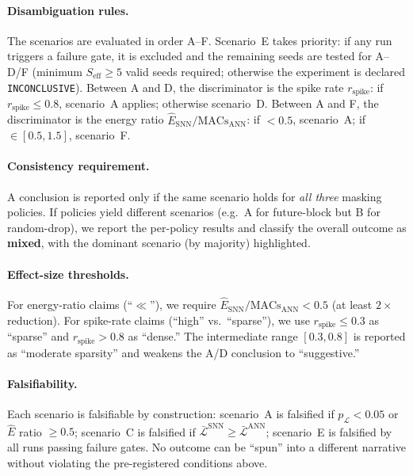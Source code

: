 \documentclass[11pt,a4paper]{article}
\begin{document}
\paragraph{Disambiguation rules.}
The scenarios are evaluated in order A--F.
Scenario~E takes priority: if any run triggers a failure gate,
it is excluded and the remaining seeds are tested for
A--D/F (minimum $S_{\text{eff}} \geq 5$ valid seeds required;
otherwise the experiment is declared \texttt{INCONCLUSIVE}).
Between A and D, the discriminator is the spike rate
$r_{\text{spike}}$: if $r_{\text{spike}} \leq 0.8$, scenario~A
applies; otherwise scenario~D.
Between A and F, the discriminator is the energy ratio
$\hat{E}_{\text{SNN}} / \text{MACs}_{\text{ANN}}$: if
$< 0.5$, scenario~A; if $\in [0.5, 1.5]$, scenario~F.

\paragraph{Consistency requirement.}
A conclusion is reported only if the same scenario holds for
\emph{all three} masking policies.  If policies yield different
scenarios (e.g.\ A for future-block but B for random-drop), we
report the per-policy results and classify the overall outcome as
\textbf{mixed}, with the dominant scenario (by majority)
highlighted.

\paragraph{Effect-size thresholds.}
For energy-ratio claims (``$\ll$''), we require
$\hat{E}_{\text{SNN}} / \text{MACs}_{\text{ANN}} < 0.5$
(at least $2\times$ reduction).  For spike-rate claims
(``high'' vs.\ ``sparse''), we use
$r_{\text{spike}} \leq 0.3$ as ``sparse'' and
$r_{\text{spike}} > 0.8$ as ``dense.''
The intermediate range $[0.3, 0.8]$ is reported as
``moderate sparsity'' and weakens the A/D conclusion
to ``suggestive.''

\paragraph{Falsifiability.}
Each scenario is falsifiable by construction:
scenario~A is falsified if $p_{\mathcal{L}} < 0.05$ or
$\hat{E}$ ratio $\geq 0.5$;
scenario~C is falsified if $\bar{\mathcal{L}}^{\text{SNN}}
\geq \bar{\mathcal{L}}^{\text{ANN}}$;
scenario~E is falsified by all runs passing failure gates.
No outcome can be ``spun'' into a different narrative without
violating the pre-registered conditions above.
\end{document}
